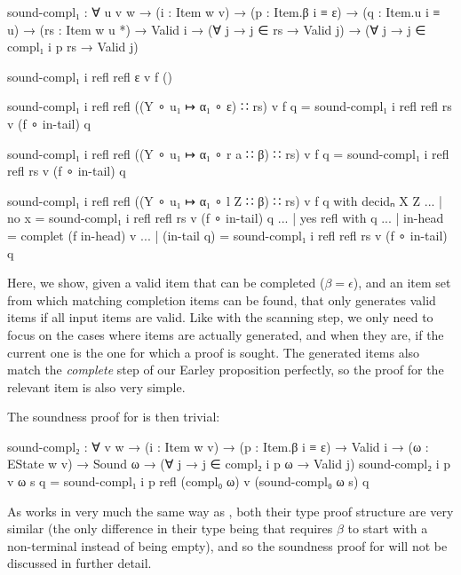 		\begin{code}
			sound-compl₁ : ∀ {u v w} →
			  (i : Item w v) →
			  (p : Item.β i ≡ ε) →
			  (q : Item.u i ≡ u) →
			  (rs : Item w u *) →
			  Valid i → (∀ {j} → j ∈ rs → Valid j) →
			  (∀ {j} → j ∈ compl₁ i p rs → Valid j)

			sound-compl₁ i refl refl ε v f ()

			sound-compl₁ i refl refl ((Y ∘ u₁ ↦ α₁ ∘ ε) ∷ rs) v f q =
			  sound-compl₁ i refl refl rs v (f ∘ in-tail) q

			sound-compl₁ i refl refl ((Y ∘ u₁ ↦ α₁ ∘ r a ∷ β) ∷ rs) v f q =
			  sound-compl₁ i refl refl rs v (f ∘ in-tail) q

			sound-compl₁ i refl refl ((Y ∘ u₁ ↦ α₁ ∘ l Z ∷ β) ∷ rs) v f q with decidₙ X Z
			... | no x = sound-compl₁ i refl refl rs v (f ∘ in-tail) q
			... | yes refl with q
			...            | in-head     = complet (f in-head) v
			...            | (in-tail q) = sound-compl₁ i refl refl rs v (f ∘ in-tail) q
		\end{code}

		Here, we show, given a valid item that can be completed ($\beta =
		\epsilon$), and an item set from which matching completion items can be
		found, that  only generates valid items if all input
		items are valid. Like with the scanning step, we only need to focus on
		the cases where items are actually generated, and when they are, if the
		current one is the one for which a proof is sought. The generated items
		also match the \emph{complete} step of our Earley proposition
		perfectly, so the proof for the relevant item is also very simple.

		The soundness proof for  is then trivial:

		\begin{code}
			sound-compl₂ : ∀ {v w} →
			  (i : Item w v) →
			  (p : Item.β i ≡ ε) →
			  Valid i → (ω : EState w v) → Sound ω →
			  (∀ {j} → j ∈ compl₂ i p ω → Valid j)
			sound-compl₂ i p v ω s q =
			  sound-compl₁ i p refl (compl₀ ω) v (sound-compl₀ ω s) q
		\end{code}

		As  works in very much the same way as
		, both their type proof structure are very similar (the
		only difference in their type being that  requires
		$\beta$ to start with a non-terminal instead of being empty), and so
		the soundness proof for  will not be discussed in
		further detail.

